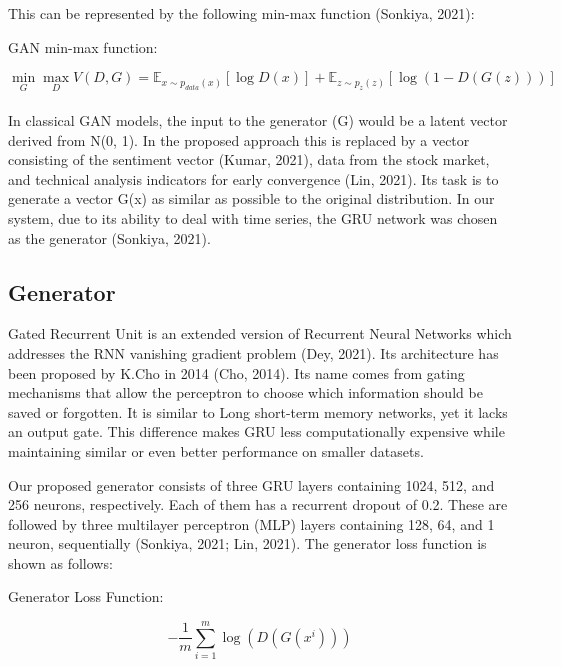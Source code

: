 \documentclass[11pt]{article} %
\begin{document}
\pagebreak
\noindent This can be represented by the following min-max function (Sonkiya, 2021): 


\begin{center}   GAN min-max function: \end{center}
\begin{equation} \min_G \max_D V(D, G)=
\mathbb{E}_{x\sim p_{data}(x)}[\log D(x)]
+ \mathbb{E}_{z\sim p_z(z)}[\log(1 - D(G(z)))] \end{equation}\\

In classical GAN models, the input to the generator (G) would be a latent vector derived from N(0, 1). In the proposed approach this is replaced by a vector consisting of the sentiment vector (Kumar, 2021), data from the stock market, and technical analysis indicators for early convergence (Lin, 2021). Its task is to generate a vector G(x) as similar as possible to the original distribution. In our system, due to its ability to deal with time series, the GRU network was chosen as the generator (Sonkiya, 2021). 


\subsection{Generator}

Gated Recurrent Unit is an extended version of Recurrent Neural Networks which addresses the RNN vanishing gradient problem (Dey, 2021).
Its architecture has been proposed by K.Cho in 2014 (Cho, 2014). Its name comes from gating mechanisms that allow the perceptron to choose which information should be saved or forgotten. It is similar to Long short-term memory networks, yet it lacks an output gate. This difference makes GRU less computationally expensive while maintaining similar or even better performance on smaller datasets. 

Our proposed generator consists of three GRU layers containing 1024, 512, and 256 neurons, respectively. Each of them has a recurrent dropout of 0.2. These are followed by three multilayer perceptron (MLP) layers containing 128, 64, and 1 neuron, sequentially (Sonkiya, 2021; Lin, 2021). 
The generator loss function is shown as follows: 

\begin{center}   Generator Loss Function:  \end{center}
\begin{equation}
-\frac{1}{m} \sum_{i=1}^{m} \log \left(D\left(G\left(x^{i}\right)\right)\right)
\end{equation}\\
\end{document}
